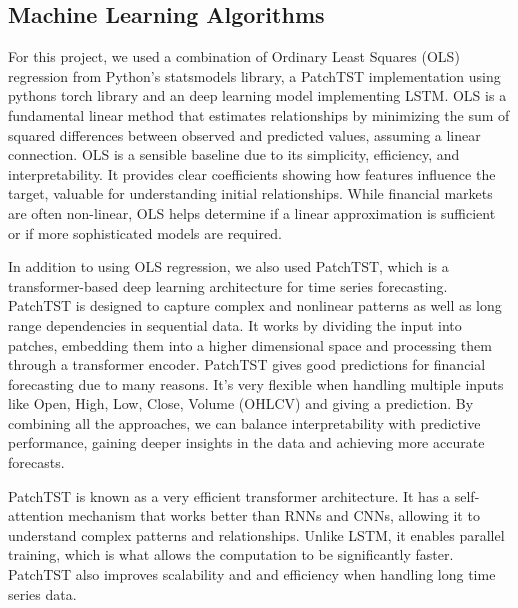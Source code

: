 \documentclass[conference]{IEEEtran}
\begin{document}
\subsection{Machine Learning Algorithms}

For this project, we used a combination of Ordinary Least Squares (OLS) regression from Python's statsmodels library, a PatchTST implementation using pythons torch library and an deep learning model implementing LSTM.   OLS is a fundamental linear method that estimates relationships by minimizing the sum of squared differences between observed and predicted values, assuming a linear connection.  OLS is a sensible baseline due to its simplicity, efficiency, and interpretability. It provides clear coefficients showing how features influence the target, valuable for understanding initial relationships. While financial markets are often non-linear, OLS helps determine if a linear approximation is sufficient or if more sophisticated models are required.

In addition to using OLS regression, we also used PatchTST, which is a transformer-based deep learning architecture for time series forecasting. PatchTST is designed to capture complex and nonlinear patterns as well as long range dependencies in sequential data. It works by dividing the input into patches, embedding them into a higher dimensional space and processing them through a transformer encoder.  PatchTST gives good predictions for financial forecasting due to many reasons. It’s very flexible when handling multiple inputs like Open, High, Low, Close, Volume (OHLCV) and giving a prediction. By combining all the approaches, we can balance interpretability with predictive performance, gaining deeper insights in the data and achieving more accurate forecasts.

PatchTST is known as a very efficient transformer architecture. It has a self-attention mechanism that works better than RNNs and CNNs, allowing it to understand complex patterns and relationships. Unlike LSTM, it enables parallel training, which is what allows the computation to be significantly faster. PatchTST also improves scalability and and efficiency when handling long time series data.  
\end{document}
